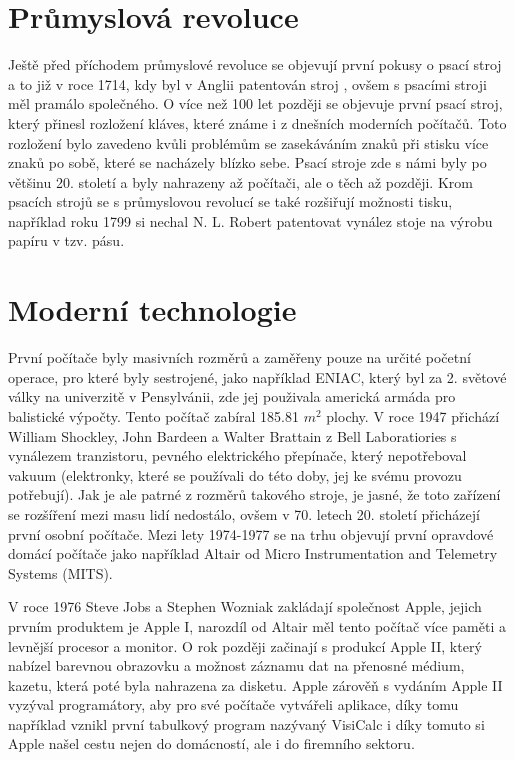 \section{Průmyslová revoluce}

Ještě před příchodem průmyslové revoluce se objevují první pokusy o psací stroj a to již v roce 1714, kdy byl v Anglii patentován stroj
 \cite{FirstTypewriter}, ovšem s psacími stroji měl pramálo společného. O více než 100 let později se
objevuje první psací stroj, který přinesl rozložení kláves, které známe i z dnešních moderních počítačů. Toto rozložení bylo zavedeno kvůli
problémům se zasekáváním znaků při stisku více znaků po sobě, které se nacházely blízko sebe. Psací stroje zde s námi byly po většinu 20. století
a byly nahrazeny až počítači, ale o těch až později. Krom psacích strojů se s průmyslovou revolucí se také rozšiřují možnosti tisku, například roku 1799
si nechal N. L. Robert patentovat vynález stoje na výrobu papíru v tzv.  pásu. \cite{Papir}

\section{Moderní technologie}

První počítače byly masivních rozměrů a zaměřeny pouze na určité početní operace, pro které byly sestrojené, jako například ENIAC, který byl za 2.
světové války na univerzitě v Pensylvánii, zde jej použivala americká armáda pro balistické výpočty. Tento počítač zabíral 185.81 $ m^2 $ plochy. \cite{historyComp} V roce
1947 přichází William Shockley, John Bardeen a Walter Brattain z Bell Laboratiories s vynálezem tranzistoru, pevného elektrického přepínače, který nepotřeboval
vakuum \cite{liveScience} (elektronky, které se používali do této doby, jej ke svému provozu potřebují). Jak je ale patrné z rozměrů takového stroje, je jasné,
že toto zařízení se rozšíření mezi masu lidí nedostálo, ovšem v 70. letech 20. století přicházejí první osobní počítače. Mezi lety 1974-1977 se na trhu objevují
první opravdové domácí počítače jako například Altair od Micro Instrumentation and Telemetry Systems (MITS). \cite{liveScience}

V roce 1976 Steve Jobs a Stephen Wozniak zakládají společnost Apple, jejich prvním produktem je Apple I, narozdíl od Altair měl tento počítač více paměti a levnější
procesor a monitor. O rok později začinají s produkcí Apple II, který nabízel barevnou obrazovku a možnost záznamu dat na přenosné médium, kazetu, která poté byla
nahrazena za disketu. Apple zárověň s vydáním Apple II vyzýval programátory, aby pro své počítače vytvářeli aplikace, díky tomu například vznikl první tabulkový program
nazývaný VisiCalc i díky tomuto si Apple našel cestu nejen do domácností, ale i do firemního sektoru. \cite{liveScience}
 \cite{liveScience}

